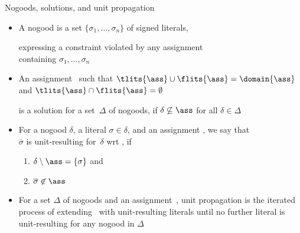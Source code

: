 \begin{frame}{Nogoods, solutions, and unit propagation}
  \begin{itemize}
  \item A \alert{nogood} is a set $\{\sigma_1,\ldots,\sigma_n\}$ of
    signed literals,

    expressing a \alert{constraint} violated by any assignment
    \\
    containing $\sigma_1,\ldots,\sigma_n$
  \item<2-> An assignment \ass\ such that
    \(
    \tlits{\ass} \cup \flits{\ass}
    =
    \domain{\ass}
    \)
    and
    \(
    \tlits{\ass} \cap \flits{\ass}
    =
    \emptyset
    \)

    is a \alert{solution} for a set~$\Delta$ of nogoods,
    if
    $\delta\not\subseteq\ass$ for all $\delta\in\Delta$
  \item<3-> For a nogood $\delta$, a literal $\sigma\in\delta$, and an assignment \ass,
    we say that\\
    \alert{$\overline{\sigma}$} is \alert{unit-resulting} for~$\delta$ wrt \ass,
    if
    \begin{enumerate}
    \item $\delta\setminus\ass=\{\sigma\}$
      and
    \item $\overline{\sigma}\not\in\ass$
    \end{enumerate}
  \item<4-> For a set $\Delta$ of nogoods and an assignment~\ass,
    \alert{unit propagation} is the iterated process of extending \ass\ with
    unit-resulting literals until no further literal is unit-resulting for any
    nogood in $\Delta$
  \end{itemize}
\end{frame}

